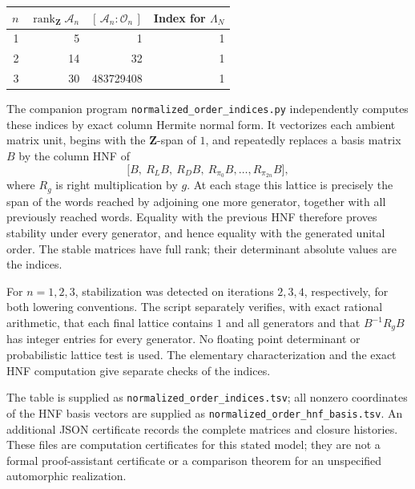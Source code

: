 \begin{center}
\begin{tabular}{rrrr}
\toprule
\(n\)&\(\operatorname{rank}_{\mathbf Z}\mathcal A_n\)&
\([\,\mathcal A_n:\mathcal O_n\,]\)&
Index for \(\Lambda_N\)\\
\midrule
1&5&1&1\\
2&14&32&1\\
3&30&483729408&1\\
\bottomrule
\end{tabular}
\end{center}

The companion program
\texttt{normalized\_order\_indices.py} independently computes
these indices by exact column Hermite normal form.  It
vectorizes each ambient matrix unit, begins with the
\(\mathbf Z\)-span of \(1\), and repeatedly replaces a
basis matrix \(B\) by the column HNF of
\[
\bigl[B,\ R_LB,\ R_DB,\ R_{\pi_0}B,\ldots,
                         R_{\pi_{2n}}B\bigr],
\]
where \(R_g\) is right multiplication by \(g\).
At each stage this lattice is precisely the span of the
words reached by adjoining one more generator, together
with all previously reached words.  Equality with the
previous HNF therefore proves stability under every
generator, and hence equality with the generated
unital order.  The stable matrices have full rank;
their determinant absolute values are the indices.

For \(n=1,2,3\), stabilization was detected on iterations
\(2,3,4\), respectively, for both lowering conventions.
The script separately verifies, with exact rational
arithmetic, that each final lattice contains \(1\) and
all generators and that \(B^{-1}R_gB\) has integer
entries for every generator.  No floating point
determinant or probabilistic lattice test is used.
The elementary characterization and the exact HNF
computation give separate checks of the indices.

The table is supplied as
\texttt{normalized\_order\_indices.tsv}; all nonzero
coordinates of the HNF basis vectors are supplied as
\texttt{normalized\_order\_hnf\_basis.tsv}.  An additional
JSON certificate records the complete matrices and
closure histories.  These files are computation
certificates for this stated model; they are not a
formal proof-assistant certificate or a comparison
theorem for an unspecified automorphic realization.

